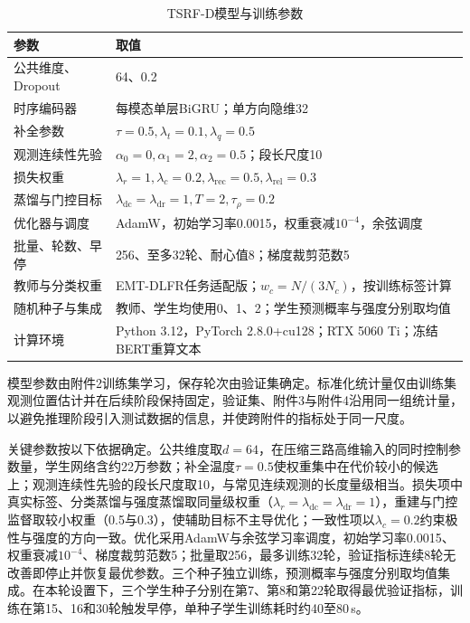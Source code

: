 \begin{table}[htbp]\centering\small
\caption{TSRF-D模型与训练参数}\label{q2:tab:params}
\begin{tabularx}{\linewidth}{p{4.4cm}Y}\toprule
参数 & 取值\\\midrule
公共维度、Dropout & 64、0.2\\
时序编码器 & 每模态单层BiGRU；单方向隐维32\\
补全参数 & $\tau=0.5,\lambda_t=0.1,\lambda_q=0.5$\\
观测连续性先验 & $\alpha_0=0,\alpha_1=2,\alpha_2=0.5$；段长尺度10\\
损失权重 & $\lambda_r=1,\lambda_c=0.2,\lambda_{\mathrm{rec}}=0.5,\lambda_{\mathrm{rel}}=0.3$\\
蒸馏与门控目标 & $\lambda_{\mathrm{dc}}=\lambda_{\mathrm{dr}}=1,T=2,\tau_{\rho}=0.2$\\
优化器与调度 & AdamW，初始学习率0.0015，权重衰减$10^{-4}$，余弦调度\\
批量、轮数、早停 & 256、至多32轮、耐心值8；梯度裁剪范数5\\
教师与分类权重 & EMT-DLFR任务适配版；$w_c=N/(3N_c)$，按训练标签计算\\
随机种子与集成 & 教师、学生均使用0、1、2；学生预测概率与强度分别取均值\\
计算环境 & Python 3.12，PyTorch 2.8.0+cu128；RTX 5060 Ti；冻结BERT重算文本\\\bottomrule
\end{tabularx}\end{table}

模型参数由附件2训练集学习，保存轮次由验证集确定。标准化统计量仅由训练集观测位置估计并在后续阶段保持固定，验证集、附件3与附件4沿用同一组统计量，以避免推理阶段引入测试数据的信息，并使跨附件的指标处于同一尺度。

关键参数按以下依据确定。公共维度取$d=64$，在压缩三路高维输入的同时控制参数量，学生网络含约22万参数；补全温度$\tau=0.5$使权重集中在代价较小的候选上；观测连续性先验的段长尺度取10，与常见连续观测的长度量级相当。损失项中真实标签、分类蒸馏与强度蒸馏取同量级权重（$\lambda_r=\lambda_{\mathrm{dc}}=\lambda_{\mathrm{dr}}=1$），重建与门控监督取较小权重（0.5与0.3），使辅助目标不主导优化；一致性项以$\lambda_c=0.2$约束极性与强度的方向一致。优化采用AdamW与余弦学习率调度，初始学习率0.0015、权重衰减$10^{-4}$、梯度裁剪范数5；批量取256，最多训练32轮，验证指标连续8轮无改善即停止并恢复最优参数。三个种子独立训练，预测概率与强度分别取均值集成。在本轮设置下，三个学生种子分别在第7、第8和第22轮取得最优验证指标，训练在第15、16和30轮触发早停，单种子学生训练耗时约40至80\,s。

